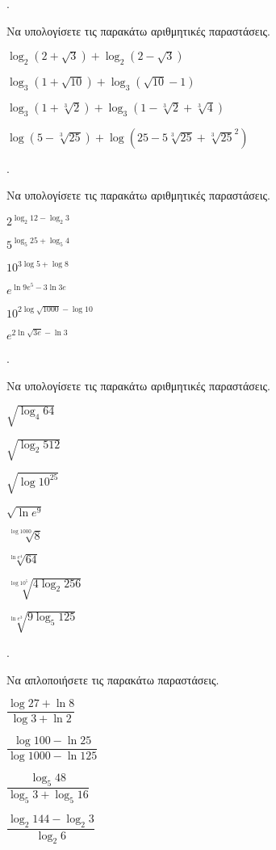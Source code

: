 \documentclass[11pt,a4paper,twocolumn]{article}
\newcounter{askhsh}
\newcommand{\askhsh}{{\large\theaskhsh.}\ \addtocounter{askhsh}{1}}
\begin{document}
\askhsh Να υπολογίσετε τις παρακάτω αριθμητικές παραστάσεις.
\begin{alist}
\item $ \log_{2}{\left(2+\sqrt{3}\right) }+\log_{2}{\left(2-\sqrt{3}\right)} $
\item $ \log_{3}{\left(1+\sqrt{10}\right) }+\log_{3}{\left(\sqrt{10}-1\right)} $
\item $ \log_{3}{\left(1+\sqrt[3]{2}\right) }+\log_{3}{\left(1-\sqrt[3]{2}+\sqrt[3]{4}\right)} $
\item $ \log{\left(5-\sqrt[3]{25}\right) }+\log{\left(25-5\sqrt[3]{25}+\sqrt[3]{25}^2\right)} $
\end{alist}
\askhsh Να υπολογίσετε τις παρακάτω αριθμητικές παραστάσεις.
\begin{multicols}{2}
\begin{alist}
\item $ 2^{\log_{2}{12}-\log_{2}{3}} $
\item $ 5^{\log_{5}{25}+\log_{5}{4}} $
\item $ 10^{3\log{5}+\log{8}} $
\item $ e^{\ln{9e^5}-3\ln{3e}} $
\item $ 10^{2\log{\sqrt{1000}}-\log{10}} $
\item $ e^{2\ln{\sqrt{3e}}-\ln{3}} $
\end{alist}
\end{multicols}
\askhsh Να υπολογίσετε τις παρακάτω αριθμητικές παραστάσεις.
\begin{multicols}{2}
\begin{alist}
\item $ \sqrt{\log_4{64}} $
\item $ \sqrt{\log_2{512}} $
\item $ \sqrt{\log{10^{25}}} $
\item $ \sqrt{\ln{e^9}} $
\item $ \sqrt[\log{1000}]{8} $
\item $ \sqrt[\ln{e^4}]{64} $
\item $ \sqrt[\log{10^5}]{4\log_2{256}} $
\item $ \sqrt[\ln{e^3}]{9\log_5{125}} $
\end{alist}
\end{multicols}
\askhsh Να απλοποιήσετε τις παρακάτω παραστάσεις.
\begin{multicols}{2}
\begin{alist}
\item $ \dfrac{\log{27}+\ln{8}}{\log{3}+\ln{2}} $
\item $ \dfrac{\log{100}-\ln{25}}{\log{1000}-\ln{125}} $
\item $ \dfrac{\log_5{48}}{\log_5{3}+\log_5{16}} $
\item $ \dfrac{\log_2{144}-\log_2{3}}{\log_2{6}} $
\end{alist}
\end{multicols}
\end{document}
